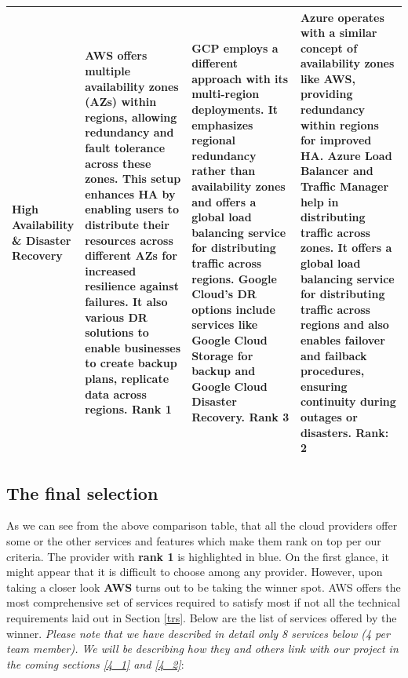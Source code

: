 \documentclass{article}
\begin{document}
\begin{table}[H]
\begin{tabular}{|p{0.1\linewidth}| p{0.3\linewidth} | p{0.3\linewidth} | p{0.3\linewidth} |}
        \textbf{High Availability \& Disaster Recovery}& 
         \color{blue} AWS offers multiple availability zones (AZs) within regions, allowing redundancy and fault tolerance across these zones.  This setup enhances HA by enabling users to distribute their resources across different AZs for increased resilience against failures. It also various DR solutions to enable businesses to create backup plans, replicate data across regions.
        \textbf{Rank 1}
         &
        GCP employs a different approach with its multi-region deployments. It emphasizes regional redundancy rather than availability zones and  offers a global load balancing service for distributing traffic across regions. Google Cloud's DR options include services like Google Cloud Storage for backup and Google Cloud Disaster Recovery. \textbf{Rank 3}
         & Azure operates with a similar concept of availability zones like AWS, providing redundancy within regions for improved HA. Azure Load Balancer and Traffic Manager help in distributing traffic across zones.  It offers a global load balancing service for distributing traffic across regions and also enables failover and failback procedures, ensuring continuity during outages or disasters. \textbf{Rank: 2}\\
         \hline
    \end{tabular}
\end{table}
\newpage
\subsection{The final selection}
As we can see from the above comparison table, that all the cloud providers offer some or the other services and features which make them rank on top per our criteria. The provider with \textbf{rank 1} is highlighted in \color{blue} blue\color{black}. On the first glance, it might appear that it is difficult to choose among any provider. However, upon taking a closer look \textbf{AWS} turns out to be taking the winner spot. AWS offers the most comprehensive set of services required to satisfy most if not all the technical requirements laid out in Section \ref{trs}. Below are the list of services offered by the winner. \textit{Please note that we have described in detail only 8 services below (4 per team member). We will be describing how they and others link with our project in the coming sections \ref{4_1} and \ref{4_2}}:
\end{document}
